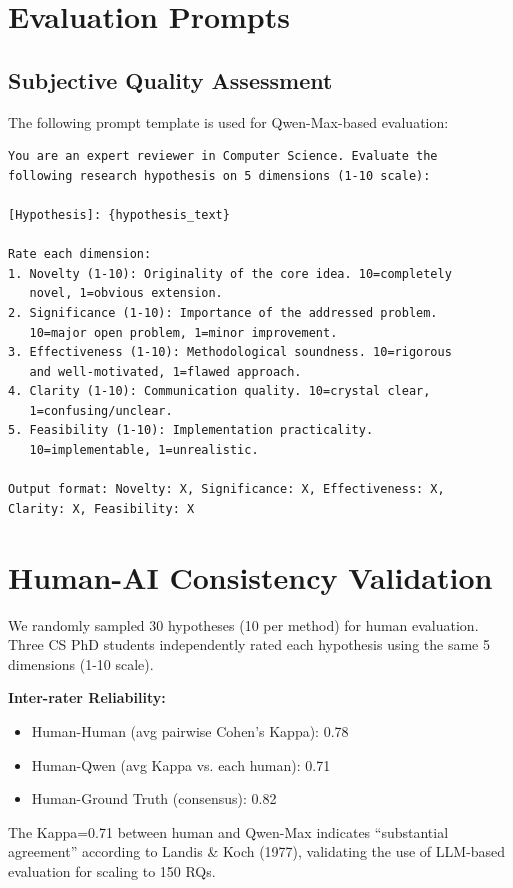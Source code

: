 \documentclass[runningheads]{llncs}
\begin{document}
\section{Evaluation Prompts}
\label{app:prompts}

\subsection{Subjective Quality Assessment}

The following prompt template is used for Qwen-Max-based evaluation:

\begin{verbatim}
You are an expert reviewer in Computer Science. Evaluate the 
following research hypothesis on 5 dimensions (1-10 scale):

[Hypothesis]: {hypothesis_text}

Rate each dimension:
1. Novelty (1-10): Originality of the core idea. 10=completely 
   novel, 1=obvious extension.
2. Significance (1-10): Importance of the addressed problem. 
   10=major open problem, 1=minor improvement.
3. Effectiveness (1-10): Methodological soundness. 10=rigorous 
   and well-motivated, 1=flawed approach.
4. Clarity (1-10): Communication quality. 10=crystal clear, 
   1=confusing/unclear.
5. Feasibility (1-10): Implementation practicality. 
   10=implementable, 1=unrealistic.

Output format: Novelty: X, Significance: X, Effectiveness: X, 
Clarity: X, Feasibility: X
\end{verbatim}

\section{Human-AI Consistency Validation}
\label{app:human_eval}

We randomly sampled 30 hypotheses (10 per method) for human evaluation. Three CS PhD students independently rated each hypothesis using the same 5 dimensions (1-10 scale).

\textbf{Inter-rater Reliability:}
\begin{itemize}[leftmargin=*]
    \item Human-Human (avg pairwise Cohen's Kappa): 0.78
    \item Human-Qwen (avg Kappa vs. each human): 0.71
    \item Human-Ground Truth (consensus): 0.82
\end{itemize}

The Kappa=0.71 between human and Qwen-Max indicates ``substantial agreement'' according to Landis \& Koch (1977), validating the use of LLM-based evaluation for scaling to 150 RQs.
\end{document}
